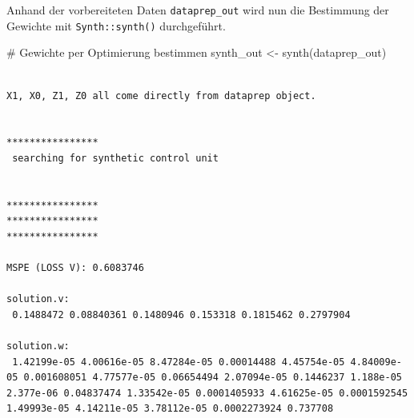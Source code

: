 \documentclass[
  a4paper,
  DIV=11,
  oneside]{scrreprt}
\newenvironment{Shaded}{\begin{snugshade}}{\end{snugshade}}
\newcommand{\AttributeTok}[1]{\textcolor[rgb]{0.40,0.45,0.13}{#1}}
\newcommand{\CommentTok}[1]{\textcolor[rgb]{0.37,0.37,0.37}{#1}}
\newcommand{\DecValTok}[1]{\textcolor[rgb]{0.68,0.00,0.00}{#1}}
\newcommand{\FloatTok}[1]{\textcolor[rgb]{0.68,0.00,0.00}{#1}}
\newcommand{\FunctionTok}[1]{\textcolor[rgb]{0.28,0.35,0.67}{#1}}
\newcommand{\NormalTok}[1]{\textcolor[rgb]{0.00,0.23,0.31}{#1}}
\newcommand{\OtherTok}[1]{\textcolor[rgb]{0.00,0.23,0.31}{#1}}
\newcommand{\SpecialCharTok}[1]{\textcolor[rgb]{0.37,0.37,0.37}{#1}}
\newcommand{\StringTok}[1]{\textcolor[rgb]{0.13,0.47,0.30}{#1}}
\begin{document}
\begin{Shaded}
\end{Shaded}

Anhand der vorbereiteten Daten \texttt{dataprep\_out} wird nun die
Bestimmung der Gewichte mit \texttt{Synth::synth()} durchgeführt.

\begin{Shaded}
\begin{Highlighting}[]
\CommentTok{\# Gewichte per Optimierung bestimmen}
\NormalTok{synth\_out }\OtherTok{\textless{}{-}} \FunctionTok{synth}\NormalTok{(dataprep\_out)}
\end{Highlighting}
\end{Shaded}

\begin{verbatim}

X1, X0, Z1, Z0 all come directly from dataprep object.


**************** 
 searching for synthetic control unit  
 

**************** 
**************** 
**************** 

MSPE (LOSS V): 0.6083746 

solution.v:
 0.1488472 0.08840361 0.1480946 0.153318 0.1815462 0.2797904 

solution.w:
 1.42199e-05 4.00616e-05 8.47284e-05 0.00014488 4.45754e-05 4.84009e-05 0.001608051 4.77577e-05 0.06654494 2.07094e-05 0.1446237 1.188e-05 2.377e-06 0.04837474 1.33542e-05 0.0001405933 4.61625e-05 0.0001592545 1.49993e-05 4.14211e-05 3.78112e-05 0.0002273924 0.737708 
\end{verbatim}
\end{document}
